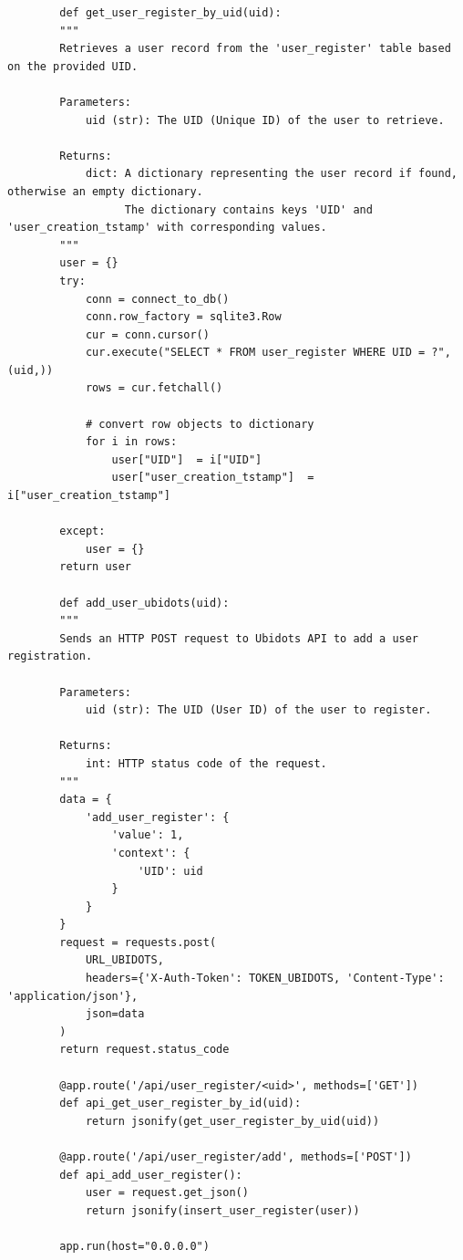 \documentclass{article}
\begin{document}
\begin{lstlisting}
        def get_user_register_by_uid(uid):
        """
        Retrieves a user record from the 'user_register' table based on the provided UID.
    
        Parameters:
            uid (str): The UID (Unique ID) of the user to retrieve.
    
        Returns:
            dict: A dictionary representing the user record if found, otherwise an empty dictionary.
                  The dictionary contains keys 'UID' and 'user_creation_tstamp' with corresponding values.
        """
        user = {}
        try:
            conn = connect_to_db()
            conn.row_factory = sqlite3.Row
            cur = conn.cursor()
            cur.execute("SELECT * FROM user_register WHERE UID = ?", (uid,))
            rows = cur.fetchall()
    
            # convert row objects to dictionary
            for i in rows:
                user["UID"]  = i["UID"]
                user["user_creation_tstamp"]  = i["user_creation_tstamp"]
                
        except:
            user = {}
        return user
    
        def add_user_ubidots(uid):
        """
        Sends an HTTP POST request to Ubidots API to add a user registration.
    
        Parameters:
            uid (str): The UID (User ID) of the user to register.
    
        Returns:
            int: HTTP status code of the request.
        """
        data = {
            'add_user_register': {
                'value': 1,
                'context': {
                    'UID': uid
                }
            }
        }
        request = requests.post(
            URL_UBIDOTS,
            headers={'X-Auth-Token': TOKEN_UBIDOTS, 'Content-Type': 'application/json'},
            json=data
        )
        return request.status_code
        
        @app.route('/api/user_register/<uid>', methods=['GET'])
        def api_get_user_register_by_id(uid):
            return jsonify(get_user_register_by_uid(uid))
        
        @app.route('/api/user_register/add', methods=['POST'])
        def api_add_user_register():
            user = request.get_json()
            return jsonify(insert_user_register(user))
    
        app.run(host="0.0.0.0")
\end{lstlisting}
\end{document}
